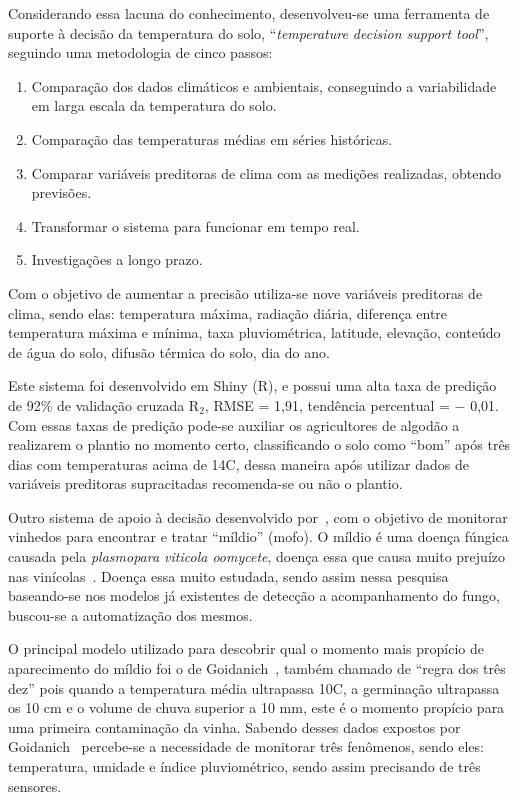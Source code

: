 \documentclass[
	article,			%
	12pt,				%
	oneside,			%
	a4paper,			%
	english,			%
	brazil,				%
	sumario=tradicional
	]{abntex2}
\begin{document}
Considerando essa lacuna do conhecimento, desenvolveu-se uma ferramenta de suporte à decisão da temperatura do solo, ``\textit{temperature decision support tool}'', seguindo uma metodologia de cinco passos:
\begin{enumerate}
  \item Comparação dos dados climáticos e ambientais, conseguindo a variabilidade em larga escala da temperatura do solo.

  \item Comparação das temperaturas médias em séries históricas.
  \item Comparar variáveis preditoras de clima com as medições realizadas, obtendo previsões.
  \item Transformar o sistema para funcionar em tempo real.
  \item Investigações a longo prazo.
\end{enumerate}

Com o objetivo de aumentar a precisão utiliza-se nove variáveis preditoras de clima, sendo elas: temperatura máxima, radiação diária, diferença entre temperatura máxima e mínima, taxa pluviométrica, latitude, elevação, conteúdo de água do solo, difusão térmica do solo, dia do ano.

Este sistema foi desenvolvido em Shiny (R), e possui uma alta taxa de predição de 92\% de validação cruzada R$_{2}$, RMSE = 1,91, tendência percentual = $-$ 0,01.
Com essas taxas de predição pode-se auxiliar os agricultores de algodão a realizarem o plantio no momento certo, classificando o solo como ``bom'' após três dias com temperaturas acima de 14\textdegree C, dessa maneira após utilizar dados de variáveis preditoras supracitadas recomenda-se ou não o plantio.

Outro sistema de apoio à decisão desenvolvido por~\citeauthor{2}, com o objetivo de monitorar vinhedos para encontrar e tratar ``míldio'' (mofo).
O míldio é uma doença fúngica causada pela \textit{plasmopara viticola oomycete}, doença essa que causa muito prejuízo nas vinícolas~\cite{2}. Doença essa muito estudada, sendo assim nessa pesquisa baseando-se nos modelos já existentes de detecção a acompanhamento do fungo, buscou-se a automatização dos mesmos.

O principal modelo utilizado para descobrir qual o momento mais propício de aparecimento do míldio foi o de Goidanich~\cite{detectando_milidio}, também chamado de ``regra dos três dez'' pois quando a temperatura média ultrapassa 10\textdegree C, a germinação ultrapassa os 10 cm e o volume de chuva superior a 10 mm, este é o momento propício para uma primeira contaminação da vinha.
Sabendo desses dados expostos por Goidanich~\cite{detectando_milidio} percebe-se a necessidade de monitorar três fenômenos, sendo eles: temperatura, umidade e índice pluviométrico, sendo assim precisando de três sensores.
\end{document}
